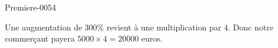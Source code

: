 
\begin{corrige}{Premiere-0054}

    Une augmentation de \( 300\%\) revient à une multiplication par \( 4\). Donc notre commerçant payera \( 5000\times 4=20000\) euros.

\end{corrige}

